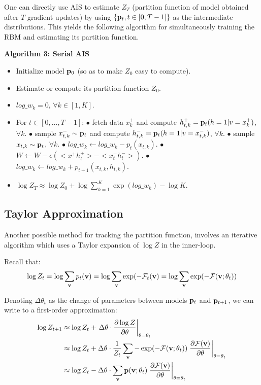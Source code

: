 \documentclass{article}
\begin{document}
One can directly use AIS to estimate $Z_T$ (partition function of model
obtained after $T$ gradient updates) by using $\{\mathbf{p}_t, t \in [0,T-1]\}$ as the
intermediate distributions. This yields the following algorithm for
simultaneously training the RBM and estimating its partition function. 
\bigskip

{\bf Algorithm 3: Serial AIS}
\begin{itemize}
    \item Initialize model $\mathbf{p}_0$ (so as to make $Z_0$ easy to compute).
    \item Estimate or compute its partition function $Z_0$.
    \item $log\_w_k = 0$, $\forall k \in [1,K]$.
    \item For $t \in [0,\dots,T-1]$:
    \subitem $\bullet$ fetch data $x^+_k$ and compute $h^+_{t,k} = \mathbf{p}_t(h=1|v=x^+_k)$, $\forall k$.
    \subitem $\bullet$ sample $x^-_{t,k} \sim \mathbf{p}_t$ and compute $h^-_{t,k} = \mathbf{p}_t(h=1|v=x^-_{t,k})$, $\forall k$.
    \subitem $\bullet$ sample $x_{t,k} \sim \mathbf{p}_t$, $\forall k$.
    \subitem $\bullet$ $log\_w_k \leftarrow log\_w_k - p_t(x_{t,k})$.
    \subitem $\bullet$ $W \leftarrow W - \epsilon (<x^+ h^+_t> - < x^-_t h^-_t >)$.
    \subitem $\bullet$ $log\_w_k \leftarrow log\_w_k + p_{t+1}(x_{t,k}, h_{t,k})$.
    \item $\log Z_T \approx \log Z_0 + \log \sum_{k=1}^K \exp(log\_w_k) - \log K$.
\end{itemize}

\subsection{Taylor Approximation}
\label{sec:taylor}

Another possible method for tracking the partition function, involves an
iterative algorithm which uses a Taylor expansion of $\log Z$ in the
inner-loop. 
\bigskip

Recall that:
\begin{align}
    \log Z_t = \log \sum_{\mathbf{v}} p_t(\mathbf{v}) 
    = \log \sum_{\mathbf{v}} \exp(-\mathcal{F}_t(\mathbf{v})
    = \log \sum_{\mathbf{v}} \exp(-\mathcal{F}(\mathbf{v}; \theta_t))
\end{align}

Denoting $\Delta \theta_t$ as the change of parameters between models $\mathbf{p}_t$
and $\mathbf{p}_{t+1}$, we can write to a first-order approximation:
\begin{align}
    \label{eq:taylor1}
    \log Z_{t+1} &\approx 
        \log Z_t + 
        \left. \Delta \theta \cdot \frac {\partial \log Z} {\partial \theta} \right|_{\theta=\theta_t} \nonumber \\
        &\approx  
            \log Z_t + 
            \Delta \theta \cdot \frac{1}{Z_t}
            \sum_{\mathbf{v}} - \exp(-\mathcal{F}(\mathbf{v}; \theta_t)) \left. \frac {\partial \mathcal{F}(\mathbf{v})} {\partial \theta} \right|_{\theta=\theta_t} \nonumber \\
        &\approx  
            \log Z_t - 
            \Delta \theta \cdot
            \sum_{\mathbf{v}} \mathbf{p}(\mathbf{v}; \theta_t) \left. \frac {\partial \mathcal{F}(\mathbf{v})} {\partial \theta} \right|_{\theta=\theta_t}
\end{align}
\bigskip
\end{document}
